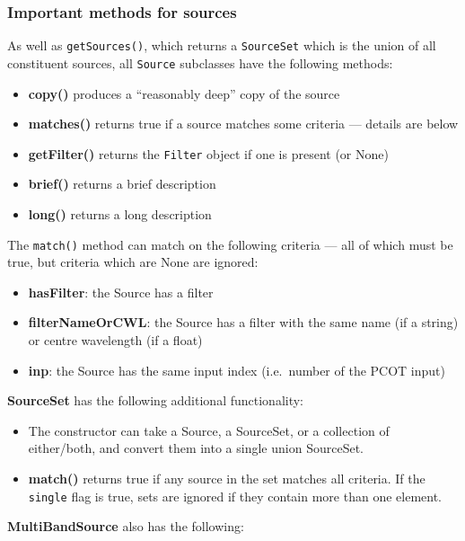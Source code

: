 \subsubsection{Important methods for sources}
As well as \texttt{getSources()}, which returns a \texttt{SourceSet} which is the union
of all constituent sources, all \texttt{Source} subclasses have the following
methods:
\begin{itemize}
\item \textbf{copy()} produces a ``reasonably deep'' copy of the source
\item \textbf{matches()} returns true if a source matches some criteria --- details are below
\item \textbf{getFilter()} returns the \texttt{Filter} object if one is present (or None)
\item \textbf{brief()} returns a brief description
\item \textbf{long()} returns a long description
\end{itemize}
The \texttt{match()} method can match on the following criteria --- all of which
must be true, but criteria which are None are ignored:
\begin{itemize}
\item \textbf{hasFilter}: the Source has a filter
\item \textbf{filterNameOrCWL}: the Source has a filter with the same name (if a string)
or centre wavelength (if a float)
\item \textbf{inp}: the Source has the same input index (i.e.\ number of the PCOT input)
\end{itemize}
\textbf{SourceSet} has the following additional functionality:
\begin{itemize}
\item The constructor can take a Source, a SourceSet, or a collection of either/both,
and convert them into a single union SourceSet.
\item \textbf{match()} returns true if any source in the set matches all criteria.
If the \texttt{single} flag is true, sets are ignored if they contain more than one element.
\end{itemize}
\textbf{MultiBandSource} also has the following:
